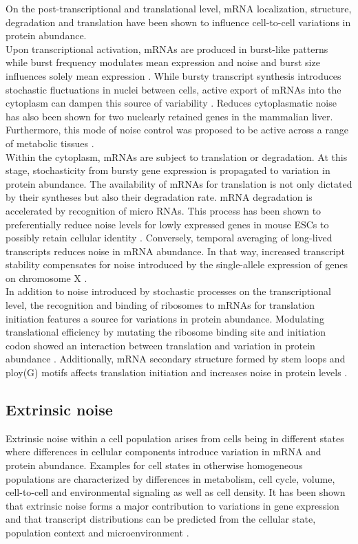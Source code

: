On the post-transcriptional and translational level, mRNA localization, structure, degradation and translation have been shown to influence cell-to-cell variations in protein abundance.\\ 
Upon transcriptional activation, mRNAs are produced in burst-like patterns while burst frequency modulates mean expression and noise and burst size influences solely mean expression \citep{Hornung2012}. While bursty transcript synthesis introduces stochastic fluctuations in nuclei between cells, active export of mRNAs into the cytoplasm can dampen this source of variability \citep{Battich2015a}. Reduces cytoplasmatic noise has also been shown for two nuclearly retained genes in the mammalian liver. Furthermore, this mode of noise control was proposed to be active across a range of metabolic tissues \cite{BaharHalpern2015a}.\\
Within the cytoplasm, mRNAs are subject to translation or degradation. At this stage, stochasticity from bursty gene expression is propagated to variation in protein abundance. The availability of mRNAs for translation is not only dictated by their syntheses but also their degradation rate. mRNA degradation is accelerated by recognition of micro RNAs. This process has been shown to preferentially reduce noise levels for lowly expressed genes in mouse ESCs to possibly retain cellular identity \citep{Schmiedel2015}. Conversely, temporal averaging of long-lived transcripts reduces noise in mRNA abundance. In that way, increased transcript stability compensates for noise introduced by the single-allele expression of genes on chromosome X \citep{Faure2017}.  \\
In addition to noise introduced by stochastic processes on the transcriptional level, the recognition and binding of ribosomes to mRNAs for translation initiation features a source for variations in protein abundance. Modulating translational efficiency by mutating the ribosome binding site and initiation codon showed an interaction between translation and variation in protein abundance \citep{Ozbudak2002}. Additionally, mRNA secondary structure formed by stem loops and ploy(G) motifs affects translation initiation and increases noise in protein levels \citep{Dacheux2017a}.

\subsection{Extrinsic noise}

Extrinsic noise within a cell population arises from cells being in different states where differences in cellular components introduce variation in mRNA and protein abundance. Examples for cell states in otherwise homogeneous populations are characterized by differences in metabolism, cell cycle, volume, cell-to-cell and environmental signaling as well as cell density. It has been shown that extrinsic noise forms a major contribution to variations in gene expression and that transcript distributions can be predicted from the cellular state, population context and microenvironment \citep{Battich2015a}.

